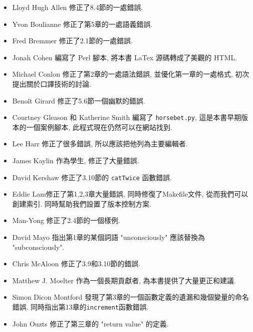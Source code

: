 \documentclass[10pt]{book}
\begin{document}
\begin{itemize}

\small
\item Lloyd Hugh Allen 修正了8.4節的一處錯誤. 

\item Yvon Boulianne 修正了第5章的一處語義錯誤. 

\item Fred Bremmer 修正了2.1節的一處錯誤. 

\item Jonah Cohen 編寫了 Perl 腳本, 將本書 LaTex 源碼轉成了美觀的 HTML. 

\item Michael Conlon 修正了第2章的一處語法錯誤, 並優化第一章的一處格式, 
初次提出關於口譯技術的討論. 

\item Beno\^{i}t Girard 修正了5.6節一個幽默的錯誤. 

\item Courtney Gleason 和 Katherine Smith 編寫了 {\tt horsebet.py}, 
這是本書早期版本的一個案例腳本, 此程式現在仍然可以在網站找到. 

\item Lee Harr 修正了很多錯誤, 所以應該把他列為主要編輯者. 

\item James Kaylin 作為學生, 修正了大量錯誤. 

\item David Kershaw 修正了3.10節的 {\tt catTwice} 函數錯誤. 

\item Eddie Lam修正了第1,2,3章大量錯誤, 同時修復了Makefile文件, 
從而我們可以創建索引. 同時幫助我們設置了版本控制方案. 

\item Man-Yong 修正了2.4節的一個樣例. 

\item David Mayo 指出第1章的某個詞語 "unconsciously"
應該替換為 "subconsciously".

\item Chris McAloon 修正了3.9和3.10節的錯誤. 

\item Matthew J. Moelter 作為一個長期貢獻者, 為本書提供了大量更正和建議. 

\item Simon Dicon Montford 發現了第3章的一個函數定義的遺漏和幾個變量的命名錯誤. 
同時指出第13章的{\tt increment}函數錯誤. 

\item John Ouzts 修正了第三章的 "return value" 的定義. 


\end{itemize}
\end{document}
